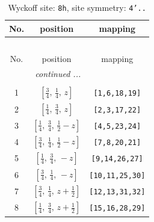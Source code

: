 \documentclass[fleqn,8pt]{jsarticle}
\begin{document}
\begin{longtable}{ccc}
\caption{Wyckoff site: {\tt 8h}, site symmetry: {\tt 4'..}}
 \\
 \hline \hline
No. & position & mapping \\ \hline \endfirsthead

\multicolumn{2}{l}{\tablename\ \thetable{}} \\
 \hline \hline
No. & position & mapping \\ \hline \endhead

 \hline \hline
\multicolumn{2}{r}{\footnotesize\it continued ...} \\ \endfoot

 \hline \hline
\multicolumn{2}{r}{} \\ \endlastfoot

1 & $\left[ \frac{3}{4},\, \frac{1}{4},\, z \right]$ & {\tt [1,6,18,19]} \\ \hline
2 & $\left[ \frac{1}{4},\, \frac{3}{4},\, z \right]$ & {\tt [2,3,17,22]} \\ \hline
3 & $\left[ \frac{1}{4},\, \frac{3}{4},\, \frac{1}{2} - z \right]$ & {\tt [4,5,23,24]} \\ \hline
4 & $\left[ \frac{3}{4},\, \frac{1}{4},\, \frac{1}{2} - z \right]$ & {\tt [7,8,20,21]} \\ \hline
5 & $\left[ \frac{1}{4},\, \frac{3}{4},\, - z \right]$ & {\tt [9,14,26,27]} \\ \hline
6 & $\left[ \frac{3}{4},\, \frac{1}{4},\, - z \right]$ & {\tt [10,11,25,30]} \\ \hline
7 & $\left[ \frac{3}{4},\, \frac{1}{4},\, z + \frac{1}{2} \right]$ & {\tt [12,13,31,32]} \\ \hline
8 & $\left[ \frac{1}{4},\, \frac{3}{4},\, z + \frac{1}{2} \right]$ & {\tt [15,16,28,29]} \\
\end{longtable}
\renewcommand{\arraystretch}{1.2}
\end{document}
